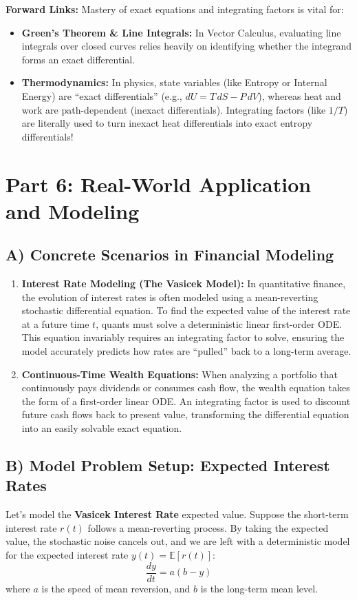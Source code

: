 \documentclass[11pt]{article}
\begin{document}
\textbf{Forward Links:} Mastery of exact equations and integrating factors is vital for:
\begin{itemize}
    \item \textbf{Green's Theorem \& Line Integrals:} In Vector Calculus, evaluating line integrals over closed curves relies heavily on identifying whether the integrand forms an exact differential.
    \item \textbf{Thermodynamics:} In physics, state variables (like Entropy or Internal Energy) are ``exact differentials'' (e.g., $dU = T \, dS - P \, dV$), whereas heat and work are path-dependent (inexact differentials). Integrating factors (like $1/T$) are literally used to turn inexact heat differentials into exact entropy differentials!
\end{itemize}

\section*{Part 6: Real-World Application and Modeling}

\subsection*{A) Concrete Scenarios in Financial Modeling}
\begin{enumerate}
    \item \textbf{Interest Rate Modeling (The Vasicek Model):} In quantitative finance, the evolution of interest rates is often modeled using a mean-reverting stochastic differential equation. To find the expected value of the interest rate at a future time $t$, quants must solve a deterministic linear first-order ODE. This equation invariably requires an integrating factor to solve, ensuring the model accurately predicts how rates are ``pulled'' back to a long-term average.
    \item \textbf{Continuous-Time Wealth Equations:} When analyzing a portfolio that continuously pays dividends or consumes cash flow, the wealth equation takes the form of a first-order linear ODE. An integrating factor is used to discount future cash flows back to present value, transforming the differential equation into an easily solvable exact equation.
\end{enumerate}

\subsection*{B) Model Problem Setup: Expected Interest Rates}
Let's model the \textbf{Vasicek Interest Rate} expected value. Suppose the short-term interest rate $r(t)$ follows a mean-reverting process. By taking the expected value, the stochastic noise cancels out, and we are left with a deterministic model for the expected interest rate $y(t) = \mathbb{E}[r(t)]$:
\[ \frac{dy}{dt} = a(b - y) \]
where $a$ is the speed of mean reversion, and $b$ is the long-term mean level.
\end{document}
